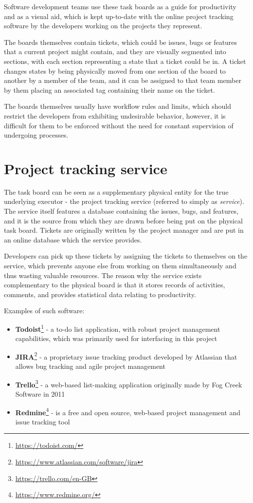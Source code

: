 \documentclass[12pt]{report}
\theoremstyle{definition}
\theoremstyle{remark}
\begin{document}
Software development teams use these task boards as a guide for productivity and as a visual aid, which is kept up-to-date with the online project tracking software by the developers working on the projects they represent.

The boards themselves contain tickets, which could be issues, bugs or features that a current project might contain, and they are visually segmented into sections, with each section representing a state that a ticket could be in. A ticket changes states by being physically moved from one section of the board to another by a member of the team, and it can be assigned to that team member by them placing an associated tag containing their name on the ticket.

The boards themselves usually have workflow rules and limits, which should restrict the developers from exhibiting undesirable behavior, however, it is difficult for them to be enforced without the need for constant supervision of undergoing processes.

\section{Project tracking service}
The task board can be seen as a supplementary physical entity for the true underlying executor - the project tracking service (referred to simply as \textit{service}). The service itself features a database containing the issues, bugs, and features, and it is the source from which they are drawn before being put on the physical task board. Tickets are originally written by the project manager and are put in an online database which the service provides.

Developers can pick up these tickets by assigning the tickets to themselves on the service, which prevents anyone else from working on them simultaneously and thus wasting valuable resources. The reason why the service exists complementary to the physical board is that it stores records of activities, comments, and provides statistical data relating to productivity.

Examples of such software: 

\begin{itemize}
    \item{\textbf{Todoist}\footnote{\url{https://todoist.com/}} - a to-do list application, with robust project management capabilities, which was primarily used for interfacing in this project}
    \item{\textbf{JIRA}\footnote{\url{https://www.atlassian.com/software/jira}} - a proprietary issue tracking product developed by Atlassian that allows bug tracking and agile project management}
    \item{\textbf{Trello}\footnote{\url{https://trello.com/en-GB}} - a web-based list-making application originally made by Fog Creek Software in 2011}
    \item{\textbf{Redmine}\footnote{\url{https://www.redmine.org/}} - is a free and open source, web-based project management and issue tracking tool}
\end{itemize}
\end{document}

